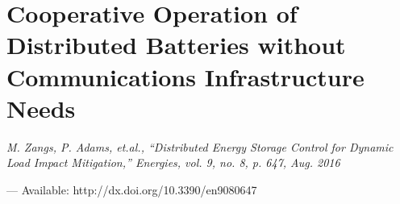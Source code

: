 \chapter{Cooperative Operation of Distributed Batteries without Communications Infrastructure Needs}
\label{ch4}

\singlespacing
\epigraph{\textit{M. Zangs, P. Adams, et.al., ``Distributed Energy Storage Control for Dynamic Load Impact Mitigation,'' Energies, vol. 9, no. 8, p. 647, Aug. 2016}}{--- Available: http://dx.doi.org/10.3390/en9080647}
\doublespacing



